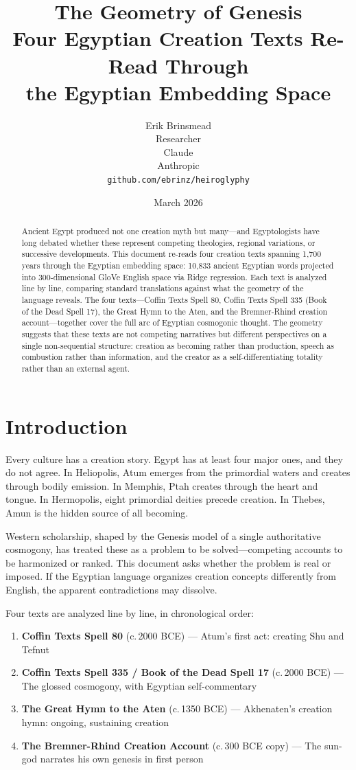 \documentclass[11pt, a4paper]{article}
\title{
    \textbf{The Geometry of Genesis}\\[6pt]
    {\large Four Egyptian Creation Texts Re-Read Through\\the Egyptian Embedding Space}
}
\author{
    Erik Brinsmead \\
    Researcher \\[6pt]
    Claude \\
    Anthropic \\[12pt]
    \texttt{github.com/ebrinz/heiroglyphy}
}
\date{March 2026}
\begin{document}
\maketitle

\begin{abstract}
Ancient Egypt produced not one creation myth but many---and Egyptologists have long debated whether these represent competing theologies, regional variations, or successive developments. This document re-reads four creation texts spanning 1,700 years through the Egyptian embedding space: 10,833 ancient Egyptian words projected into 300-dimensional GloVe English space via Ridge regression. Each text is analyzed line by line, comparing standard translations against what the geometry of the language reveals. The four texts---Coffin Texts Spell 80, Coffin Texts Spell 335 (Book of the Dead Spell 17), the Great Hymn to the Aten, and the Bremner-Rhind creation account---together cover the full arc of Egyptian cosmogonic thought. The geometry suggests that these texts are not competing narratives but different perspectives on a single non-sequential structure: creation as becoming rather than production, speech as combustion rather than information, and the creator as a self-differentiating totality rather than an external agent.
\end{abstract}

\tableofcontents

\section{Introduction}

Every culture has a creation story. Egypt has at least four major ones, and they do not agree. In Heliopolis, Atum emerges from the primordial waters and creates through bodily emission. In Memphis, Ptah creates through the heart and tongue. In Hermopolis, eight primordial deities precede creation. In Thebes, Amun is the hidden source of all becoming.

Western scholarship, shaped by the Genesis model of a single authoritative cosmogony, has treated these as a problem to be solved---competing accounts to be harmonized or ranked. This document asks whether the problem is real or imposed. If the Egyptian language organizes creation concepts differently from English, the apparent contradictions may dissolve.

Four texts are analyzed line by line, in chronological order:

\begin{enumerate}[nosep]
    \item \textbf{Coffin Texts Spell 80} (c.\,2000 BCE) --- Atum's first act: creating Shu and Tefnut
    \item \textbf{Coffin Texts Spell 335 / Book of the Dead Spell 17} (c.\,2000 BCE) --- The glossed cosmogony, with Egyptian self-commentary
    \item \textbf{The Great Hymn to the Aten} (c.\,1350 BCE) --- Akhenaten's creation hymn: ongoing, sustaining creation
    \item \textbf{The Bremner-Rhind Creation Account} (c.\,300 BCE copy) --- The sun-god narrates his own genesis in first person
\end{enumerate}
\end{document}
